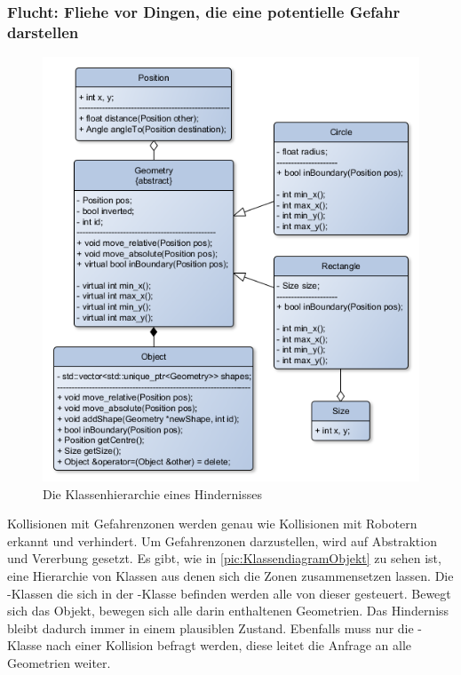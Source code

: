 \subsubsection*{Flucht: Fliehe vor Dingen, die eine potentielle Gefahr darstellen}

\begin{figure}
	\includegraphics[width=\pictureWidth,keepaspectratio]{graphics/Klassendiagramme/KlassendiagrammObject.png}
	\caption{Die Klassenhierarchie eines Hindernisses}
	\label{pic:KlassendiagramObjekt}
\end{figure}

Kollisionen mit Gefahrenzonen werden genau wie Kollisionen mit Robotern erkannt und verhindert.
Um Gefahrenzonen darzustellen, wird auf Abstraktion und Vererbung gesetzt. Es gibt, wie in \autoref{pic:KlassendiagramObjekt} zu sehen ist, eine Hierarchie von Klassen aus denen sich die Zonen zusammensetzen lassen. Die -Klassen die sich in der -Klasse befinden werden alle von dieser gesteuert. Bewegt sich das Objekt, bewegen sich alle darin enthaltenen Geometrien. Das Hinderniss bleibt dadurch immer in einem plausiblen Zustand. Ebenfalls muss nur die -Klasse nach einer Kollision befragt werden, diese leitet die Anfrage an alle Geometrien weiter.


